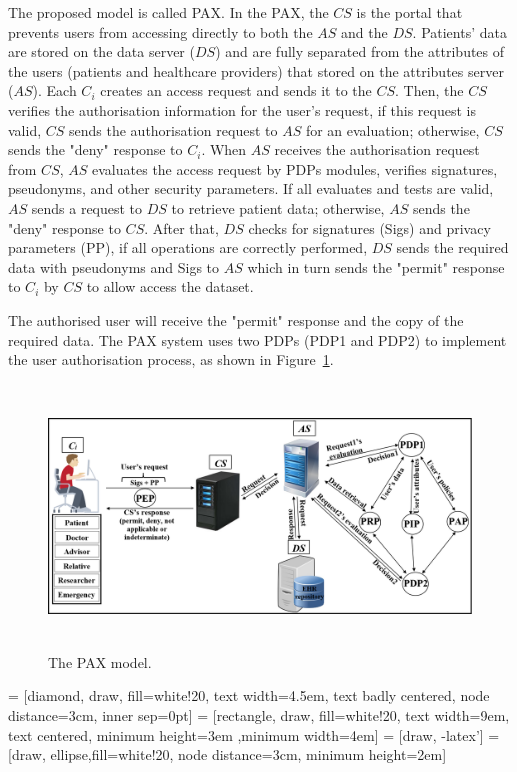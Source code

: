 \documentclass[journal,article,submit,moreauthors,pdftex]{Definitions/mdpi}
\begin{document}
 The proposed model is called PAX. In the PAX, the $CS$ is the portal that prevents users
 from accessing directly to both the $AS$ and the $DS$.  Patients' data are stored on the data
 server ($DS$) and are fully separated from the attributes of the users (patients and
 healthcare providers) that stored on the attributes server ($AS$). Each $C_i$ creates
 an access request and sends it to the $CS$. Then, the $CS$ verifies the authorisation
 information for the user's request, if this request is valid, $CS$ sends the authorisation
 request to $AS$ for an evaluation; otherwise, $CS$ sends the "deny" response to $C_i$. When $AS$ receives the authorisation request from $CS$, $AS$ evaluates the access request by PDPs modules, verifies signatures, pseudonyms, and other security parameters. If all evaluates and tests are valid, $AS$ sends a request to $DS$ to retrieve patient data; otherwise, $AS$ sends the "deny" response to $CS$. After that, $DS$ checks for signatures (Sigs) and privacy parameters (PP), if all operations are correctly performed, $DS$ sends the required data with pseudonyms and Sigs to $AS$ which in turn sends the "permit" response to $C_i$ by $CS$ to allow access the dataset.

 The authorised user will receive the "permit" response and the copy of the required data.
 The PAX system uses two PDPs (PDP1 and PDP2) to implement the user authorisation process,
 as shown in Figure~\ref{fig:pax}.
\begin{figure}[ht!]
\centering
  \includegraphics[width=14cm,height=7cm]{PAX.png}
	 \caption{The PAX model.}
	\label{fig:pax}
\end{figure}
 = [diamond, draw, fill=white!20, text width=4.5em, text badly centered, node distance=3cm, inner sep=0pt]
 = [rectangle, draw, fill=white!20, text width=9em, text centered, minimum height=3em ,minimum width=4em]
 = [draw, -latex']   %
 = [draw, ellipse,fill=white!20, node distance=3cm, minimum height=2em]
\end{document}

